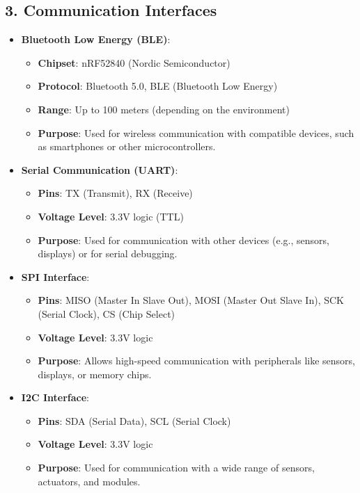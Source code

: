 	\subsection*{3. Communication Interfaces}
	
	\begin{itemize}
		\item \textbf{Bluetooth Low Energy (BLE)}:
		\begin{itemize}
			\item \textbf{Chipset}: nRF52840 (Nordic Semiconductor)
			\item \textbf{Protocol}: Bluetooth 5.0, BLE (Bluetooth Low Energy)
			\item \textbf{Range}: Up to 100 meters (depending on the environment)
			\item \textbf{Purpose}: Used for wireless communication with compatible devices, such as smartphones or other microcontrollers.
		\end{itemize}
		
		\item \textbf{Serial Communication (UART)}:
		\begin{itemize}
			\item \textbf{Pins}: TX (Transmit), RX (Receive)
			\item \textbf{Voltage Level}: 3.3V logic (TTL)
			\item \textbf{Purpose}: Used for communication with other devices (e.g., sensors, displays) or for serial debugging.
		\end{itemize}
		
		\item \textbf{SPI Interface}:
		\begin{itemize}
			\item \textbf{Pins}: MISO (Master In Slave Out), MOSI (Master Out Slave In), SCK (Serial Clock), CS (Chip Select)
			\item \textbf{Voltage Level}: 3.3V logic
			\item \textbf{Purpose}: Allows high-speed communication with peripherals like sensors, displays, or memory chips.
		\end{itemize}
		
		\item \textbf{I2C Interface}:
		\begin{itemize}
			\item \textbf{Pins}: SDA (Serial Data), SCL (Serial Clock)
			\item \textbf{Voltage Level}: 3.3V logic
			\item \textbf{Purpose}: Used for communication with a wide range of sensors, actuators, and modules.
		\end{itemize}
		

\end{itemize}
